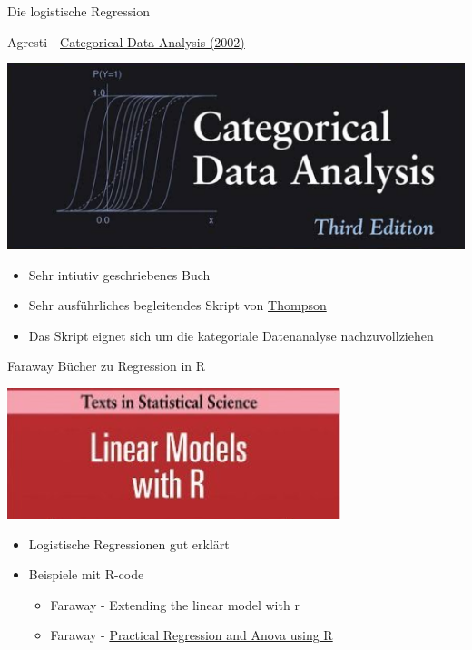 \documentclass[ignorenonframetext,]{beamer}
\providecommand{\tightlist}{%
\setlength{\itemsep}{0pt}\setlength{\parskip}{0pt}}
\begin{document}
\begin{frame}{Die logistische Regression}

\end{frame}

\begin{frame}{Agresti -
\href{https://mathdept.iut.ac.ir/sites/mathdept.iut.ac.ir/files/AGRESTI.PDF}{Categorical
Data Analysis (2002)}}

\includegraphics{./tex2pdf.956/e62a7c255a40c0581f3d3ef287e31084fd26ed1b.png}

\begin{itemize}
\tightlist
\item
  Sehr intiutiv geschriebenes Buch
\item
  Sehr ausführliches begleitendes Skript von
  \href{http://statweb.stanford.edu/~owen/courses/306a/Splusdiscrete2.pdf}{Thompson}
\item
  Das Skript eignet sich um die kategoriale Datenanalyse
  nachzuvollziehen
\end{itemize}

\end{frame}

\begin{frame}{Faraway Bücher zu Regression in R}

\includegraphics{./tex2pdf.956/1223d2e18b0151842020ec4783de22bd42a2b483.png}

\begin{itemize}
\item
  Logistische Regressionen gut erklärt
\item
  Beispiele mit R-code

  \begin{itemize}
  \item
    Faraway - Extending the linear model with r
  \item
    Faraway -
    \href{https://cran.r-project.org/doc/contrib/Faraway-PRA.pdf}{Practical
    Regression and Anova using R}
  \end{itemize}
\end{itemize}

\end{frame}
\end{document}
